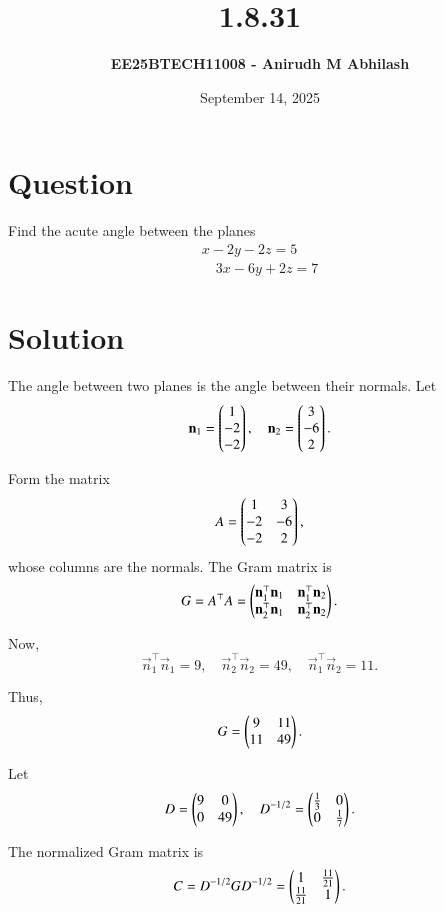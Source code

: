\documentclass[12pt]{article}
\title{\textbf{1.8.31}}
\author{\textbf{EE25BTECH11008 - Anirudh M Abhilash}}
\date{September 14, 2025}
\begin{document}
\maketitle
\section*{Question}

Find the acute angle between the planes 
\begin{align*}
x - 2y - 2z = 5 \\
\quad 3x - 6y + 2z = 7
\end{align*}

\section*{Solution}

The angle between two planes is the angle between their normals.
Let
\[
\mathbf{n}_1 = \begin{pmatrix}1 \\ -2 \\ -2\end{pmatrix}, 
\quad \mathbf{n}_2 = \begin{pmatrix}3 \\ -6 \\ 2\end{pmatrix}.
\]

Form the matrix\
\begin{align}
A = \begin{pmatrix}1 & 3 \\ -2 & -6 \\ -2 & 2\end{pmatrix},
\end{align}
whose columns are the normals.  
The Gram matrix is
\begin{align}
G = A^\top A 
= \begin{pmatrix}\mathbf{n}_1^\top \mathbf{n}_1 & \mathbf{n}_1^\top \mathbf{n}_2 \\ \mathbf{n}_2^\top \mathbf{n}_1 & \mathbf{n}_2^\top \mathbf{n}_2\end{pmatrix}.
\end{align}

Now,
\[
\vec{n}_1^\top \vec{n}_1 = 9, \quad 
\vec{n}_2^\top \vec{n}_2 = 49, \quad 
\vec{n}_1^\top \vec{n}_2 = 11.
\]

Thus,
\begin{align}
G = \begin{pmatrix}9 & 11 \\ 11 & 49\end{pmatrix}.
\end{align}


Let
\begin{align}
D = \begin{pmatrix}9 & 0 \\ 0 & 49\end{pmatrix}, 
\quad D^{-1/2} = \begin{pmatrix}\tfrac{1}{3} & 0 \\ 0 & \tfrac{1}{7}\end{pmatrix}.
\end{align}


The normalized Gram matrix is
\begin{align}
C = D^{-1/2} G D^{-1/2} 
= \begin{pmatrix}1 & \tfrac{11}{21} \\ \tfrac{11}{21} & 1\end{pmatrix}.
\end{align}
\end{document}
